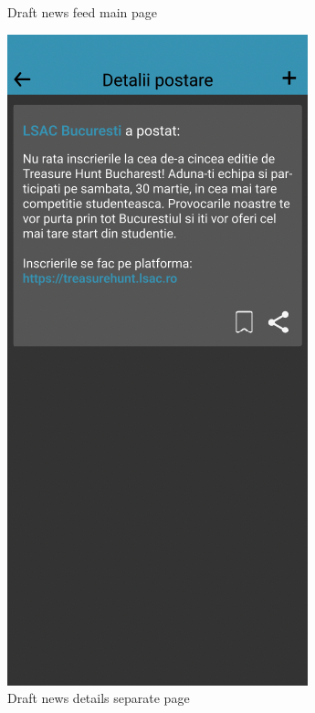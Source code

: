 \begin{figure}[!ht]
\begin{minipage}[t]{0.4\textwidth}
        \caption{Draft news feed main page}
        \label{4:fig:draft-news-main-list-page}
    \end{minipage}
    \hfill
    \begin{minipage}[t]{0.4\textwidth}
        \captionsetup{justification=centering}
        \includegraphics[width=\textwidth]{figures/app/initial/news-details-draft.png}
        \caption{Draft news details separate page}
        \label{4:fig:draft-news-details-page}
    \end{minipage}
\end{figure}

